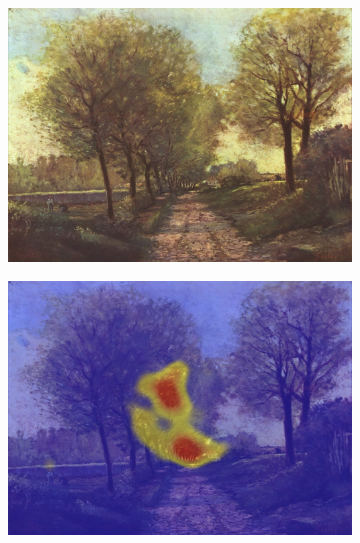 \begin{figure}[!ht]
    \centering
    \begin{subfigure}{.3\textwidth}
        \centering
        \includegraphics[width=\linewidth]{datas/fondu_00.jpg}
        \caption{}
    \end{subfigure}
    \begin{subfigure}{.3\textwidth}
        \centering
        \includegraphics[width=\linewidth]{datas/fondu_02.jpg}
        \caption{}
    \end{subfigure}
    \begin{subfigure}{.3\textwidth}
        \centering

\end{subfigure}
\end{figure}

